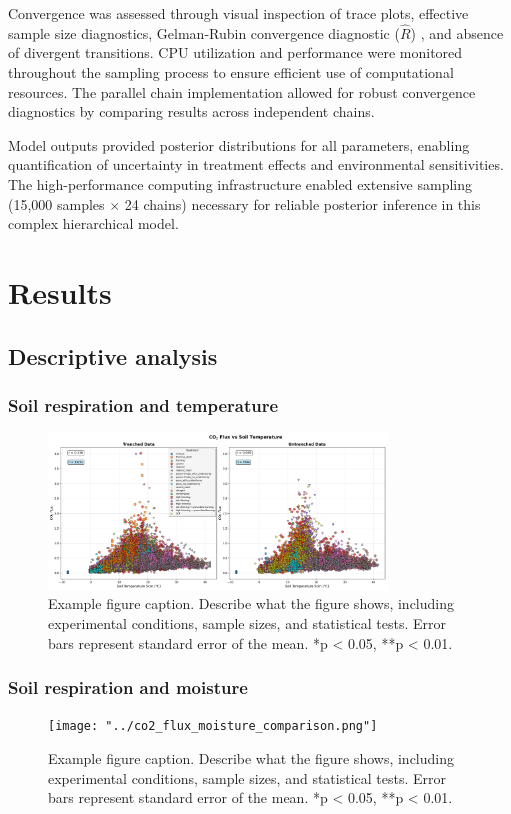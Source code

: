 \documentclass[12pt,a4paper]{article}
\begin{document}
Convergence was assessed through visual inspection of trace plots, effective sample size diagnostics, Gelman-Rubin convergence diagnostic ($\hat{R}$) \citep{gelman1992inference, vehtari2021rank}, and absence of divergent transitions. CPU utilization and performance were monitored throughout the sampling process to ensure efficient use of computational resources. The parallel chain implementation allowed for robust convergence diagnostics by comparing results across independent chains.

Model outputs provided posterior distributions for all parameters, enabling quantification of uncertainty in treatment effects and environmental sensitivities. The high-performance computing infrastructure enabled extensive sampling (15,000 samples $\times$ 24 chains) necessary for reliable posterior inference in this complex hierarchical model.


\section{Results}

\subsection{Descriptive analysis}

\subsubsection{Soil respiration and temperature}
\begin{figure}[H]
    \centering
    \includegraphics[width=0.8\textwidth]{"../co2_flux_temperature_comparison.png"}
    \caption{Example figure caption. Describe what the figure shows, including experimental conditions, sample sizes, and statistical tests. Error bars represent standard error of the mean. *p < 0.05, **p < 0.01.}
    \label{fig:co2_temp}
\end{figure}

\subsubsection{Soil respiration and moisture}
\begin{figure}[H]
    \centering
    \texttt{[image: "../co2\_flux\_moisture\_comparison.png"]}
    \caption{Example figure caption. Describe what the figure shows, including experimental conditions, sample sizes, and statistical tests. Error bars represent standard error of the mean. *p < 0.05, **p < 0.01.}
    \label{fig:co2_moisture}
\end{figure}
\end{document}
